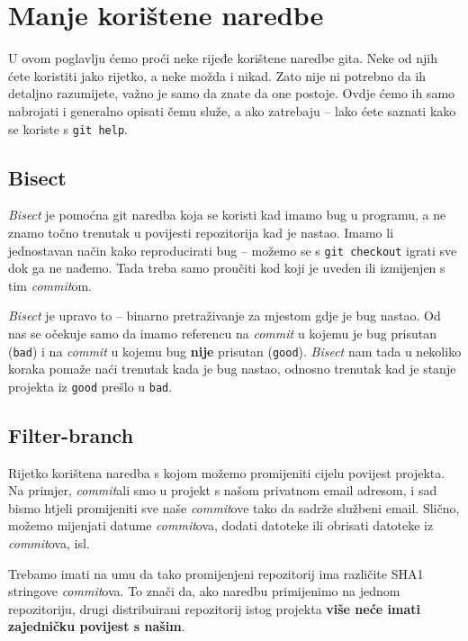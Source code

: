 \chapter*{Manje korištene naredbe}

U ovom poglavlju ćemo proći neke rijeđe korištene naredbe gita.
Neke od njih ćete koristiti jako rijetko, a neke možda i nikad.
Zato nije ni potrebno da ih detaljno razumijete, važno je samo da znate da one postoje. 
Ovdje ćemo ih samo nabrojati i generalno opisati čemu služe, a ako zatrebaju -- lako ćete saznati kako se koriste s \verb+git help+.

\section*{Bisect}

\emph{Bisect} je pomoćna git naredba koja se koristi kad imamo bug u programu, a ne znamo točno trenutak u povijesti repozitorija kad je nastao.
Imamo li jednostavan način kako reproducirati bug -- možemo se s \verb+git checkout+ igrati sve dok ga ne nađemo.
Tada treba samo proučiti kod koji je uveden ili izmijenjen s tim \emph{commit}om.

\emph{Bisect} je upravo to -- binarno pretraživanje za mjestom gdje je bug nastao.
Od nas se očekuje samo da imamo referencu na \emph{commit} u kojemu je bug prisutan (\verb+bad+) i na \emph{commit} u kojemu bug \textbf{nije} prisutan (\verb+good+).
\emph{Bisect} nam tada u nekoliko koraka pomaže naći trenutak kada je bug nastao, odnosno trenutak kad je stanje projekta iz \verb+good+ prešlo u \verb+bad+.

\section*{Filter-branch}

Rijetko korištena naredba s kojom možemo promijeniti cijelu povijest projekta.
Na primjer, \emph{commit}ali smo u projekt s našom privatnom email adresom, i sad bismo htjeli promijeniti sve naše \emph{commit}ove tako da sadrže službeni email.
Slično, možemo mijenjati datume \emph{commit}ova, dodati datoteke ili obrisati datoteke iz \emph{commit}ova, isl.

Trebamo imati na umu da tako promijenjeni repozitorij ima različite SHA1 stringove \emph{commit}ova.
To znači da, ako naredbu primijenimo na jednom repozitoriju, drugi distribuirani repozitorij istog projekta \textbf{više neće imati zajedničku povijest s našim}.

